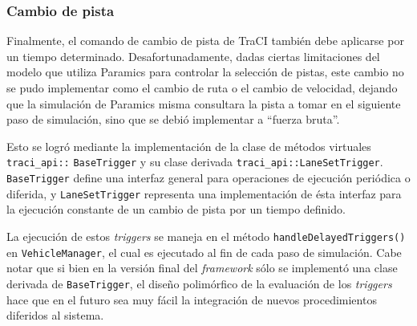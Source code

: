 \subsubsection{Cambio de pista}\label{sec:laneoverride}

Finalmente, el comando de cambio de pista de TraCI también debe aplicarse por un tiempo determinado. Desafortunadamente, dadas ciertas limitaciones del modelo que utiliza Paramics para controlar la selección de pistas, este cambio no se pudo implementar como el cambio de ruta o el cambio de velocidad, dejando que la simulación de Paramics misma consultara la pista a tomar en el siguiente paso de simulación, sino que se debió implementar a ``fuerza bruta''.

Esto se logró mediante la implementación de la clase de métodos virtuales \texttt{traci\_api::}
\texttt{BaseTrigger} y su clase derivada \texttt{traci\_api::LaneSetTrigger}. \texttt{BaseTrigger} define una interfaz general para operaciones de ejecución periódica o diferida, y \texttt{LaneSetTrigger} representa una implementación de ésta interfaz para la ejecución constante de un cambio de pista por un tiempo definido.



La ejecución de estos \emph{triggers} se maneja en el método \texttt{handleDelayedTriggers()} en \texttt{VehicleManager}, el cual es ejecutado al fin de cada paso de simulación. Cabe notar que si bien en la versión final del \emph{framework} sólo se implementó una clase derivada de \texttt{BaseTrigger}, el diseño polimórfico de la evaluación de los \emph{triggers} hace que en el futuro sea muy fácil la integración de nuevos procedimientos diferidos al sistema.



